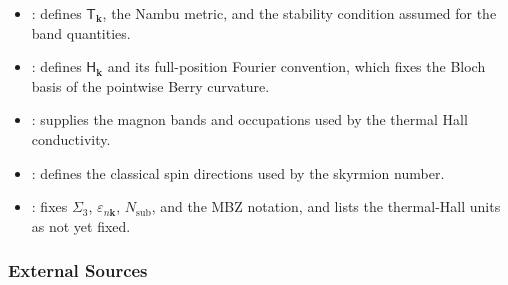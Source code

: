 \begin{itemize}
\tightlist
\item
  : defines \(\mathsf T_{\mathbf k}\), the Nambu metric, and the stability condition assumed for the band quantities.
\item
  : defines \(\mathsf H_{\mathbf k}\) and its full-position Fourier convention, which fixes the Bloch basis of the pointwise Berry curvature.
\item
  : supplies the magnon bands and occupations used by the thermal Hall conductivity.
\item
  : defines the classical spin directions used by the skyrmion number.
\item
  : fixes \(\Sigma_3\), \(\varepsilon_{n\mathbf k}\), \(N_{\mathrm{sub}}\), and the MBZ notation, and lists the thermal-Hall units as not yet fixed.
\end{itemize}

\subsubsection{External Sources}

